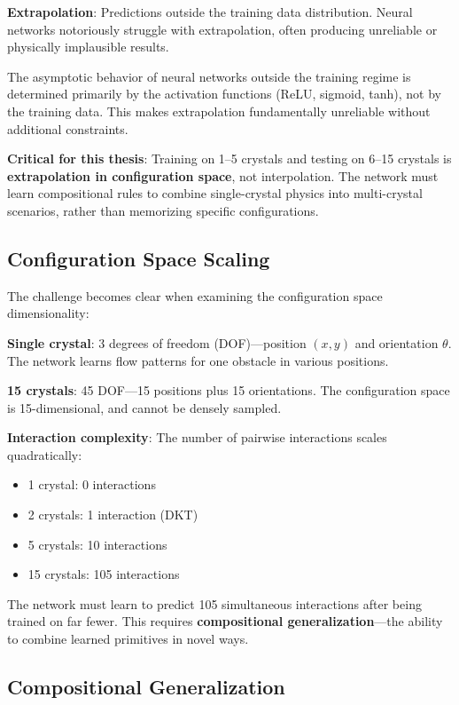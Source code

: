 \textbf{Extrapolation}: Predictions outside the training data distribution. Neural networks notoriously struggle with extrapolation, often producing unreliable or physically implausible results.

The asymptotic behavior of neural networks outside the training regime is determined primarily by the activation functions (ReLU, sigmoid, tanh), not by the training data. This makes extrapolation fundamentally unreliable without additional constraints.

\textbf{Critical for this thesis}: Training on 1--5 crystals and testing on 6--15 crystals is \textbf{extrapolation in configuration space}, not interpolation. The network must learn compositional rules to combine single-crystal physics into multi-crystal scenarios, rather than memorizing specific configurations.

\subsection{Configuration Space Scaling}

The challenge becomes clear when examining the configuration space dimensionality:

\textbf{Single crystal}: 3 degrees of freedom (DOF)---position $(x, y)$ and orientation $\theta$. The network learns flow patterns for one obstacle in various positions.

\textbf{15 crystals}: 45 DOF---15 positions plus 15 orientations. The configuration space is 15-dimensional, and cannot be densely sampled.

\textbf{Interaction complexity}: The number of pairwise interactions scales quadratically:
\begin{itemize}
    \item 1 crystal: 0 interactions
    \item 2 crystals: 1 interaction (DKT)
    \item 5 crystals: 10 interactions
    \item 15 crystals: 105 interactions
\end{itemize}

The network must learn to predict 105 simultaneous interactions after being trained on far fewer. This requires \textbf{compositional generalization}---the ability to combine learned primitives in novel ways.

\subsection{Compositional Generalization}

